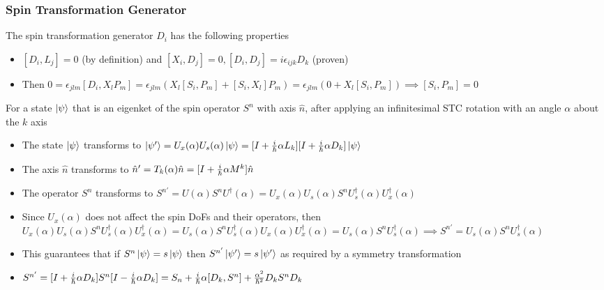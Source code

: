\documentclass[8pt,t,mathserif,aspectratio=169]{beamer}
\begin{document}
\begin{frame}
  \frametitle{Spin Transformation Generator}
  \vspace{1mm}
  The spin transformation generator $D_i$ has the following properties
  \begin{itemize}
    \item $[D_i,L_j] = 0$ (by definition) and $[X_i,D_j] = 0, [D_i,D_j] = i \epsilon_{ijk} D_k$ (proven)
    \item Then $0 = \epsilon_{jlm} [D_i,X_l P_m] = \epsilon_{jlm} (X_l [S_i,P_m] + [S_i,X_l] P_m) = \epsilon_{jlm} (0 + X_l [S_i,P_m]) \implies [S_i,P_m] = 0$
  \end{itemize}
  For a state $\ket{\psi}$ that is an eigenket of the spin operator $S^n$ with axis $\hat{n}$, after applying an infinitesimal STC rotation with an angle $\alpha$ about the $k$ axis
  \begin{itemize}
    \item The state $\ket{\psi}$ transforms to $\ket{\psi'} = U_x(\alpha) U_s(\alpha) \ket{\psi} = [I + {i \over \hbar} \alpha L_k][I + {i \over \hbar} \alpha D_k] \ket{\psi}$
    \item The axis $\hat{n}$ transforms to $\hat{n}' = T_k(\alpha) \hat{n} = [I + {i \over \hbar} \alpha M^k] \hat{n}$
    \item The operator $S^n$ transforms to $S^{n'} = U(\alpha) S^{n} U^{\dagger}(\alpha) = U_x(\alpha) U_s(\alpha) S^{n} U^{\dagger}_s(\alpha) U^{\dagger}_x(\alpha)$
    \item Since $U_x(\alpha)$ does not affect the spin DoFs and their operators, then $U_x(\alpha) U_s(\alpha) S^{n} U^{\dagger}_s(\alpha) U^{\dagger}_x(\alpha) = U_s(\alpha) S^{n} U^{\dagger}_s(\alpha) U_x(\alpha) U^{\dagger}_x(\alpha) = U_s(\alpha) S^{n} U^{\dagger}_s(\alpha) \implies S^{n'} = U_s(\alpha) S^{n} U^{\dagger}_s(\alpha)$
    \item This guarantees that if $S^n \ket{\psi} = s \ket{\psi}$ then $S^{n'} \ket{\psi'} = s \ket{\psi'}$ as required by a symmetry transformation
    \item $S^{n'} = [I + {i \over \hbar} \alpha D_k] S^{n} [I - {i \over \hbar} \alpha D_k] = S_n + {i \over \hbar} \alpha [D_k,S^n] + {\alpha^2 \over \hbar^2} D_k S^n D_k$
  \end{itemize}
\end{frame}
\end{document}
